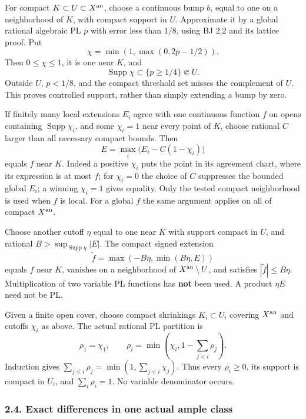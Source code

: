 \documentclass[
  10pt,
]{article}
\begin{document}
For compact \(K\subset U\subset X^{\rm an}\), choose a continuous bump
\(b\), equal to one on a neighborhood of \(K\), with compact support in
\(U\). Approximate it by a global rational algebraic PL \(p\) with error
less than \(1/8\), using BJ 2.2 and its lattice proof. Put
\[\chi=\min(1,\max(0,2p-1/2)). \tag{2.5}\] Then \(0\le\chi\le1\), it is
one near \(K\), and
\[\operatorname{Supp}\chi\subset\{p\ge1/4\}\Subset U.\] Outside \(U\),
\(p<1/8\), and the compact threshold set misses the complement of \(U\).
This proves controlled support, rather than simply extending a bump by
zero.

If finitely many local extensions \(E_i\) agree with one continuous
function \(f\) on opens containing \(\operatorname{Supp}\chi_i\), and
some \(\chi_i=1\) near every point of \(K\), choose rational \(C\)
larger than all necessary compact bounds. Then
\[E=\max_i\bigl(E_i-C(1-\chi_i)\bigr) \tag{2.6}\] equals \(f\) near
\(K\). Indeed a positive \(\chi_i\) puts the point in its agreement
chart, where its expression is at most \(f\); for \(\chi_i=0\) the
choice of \(C\) suppresses the bounded global \(E_i\); a winning
\(\chi_i=1\) gives equality. Only the tested compact neighborhood is
used when \(f\) is local. For a global \(f\) the same argument applies
on all of compact \(X^{\rm an}\).

Choose another cutoff \(\eta\) equal to one near \(K\) with support
compact in \(U\), and rational \(B>\sup_{\operatorname{Supp}\eta}|E|\).
The compact signed extension
\[\widetilde f=\max(-B\eta,\min(B\eta,E)) \tag{2.7}\] equals \(f\) near
\(K\), vanishes on a neighborhood of \(X^{\rm an}\setminus U\), and
satisfies \(|\widetilde f|\le B\eta\). Multiplication of two variable PL
functions has \textbf{not} been used. A product \(\eta E\) need not be
PL.

Given a finite open cover, choose compact shrinkings \(K_i\subset U_i\)
covering \(X^{\rm an}\) and cutoffs \(\chi_i\) as above. The actual
rational PL partition is
\[\rho_1=\chi_1,\qquad \rho_i=\min(\chi_i,1-\sum_{j<i}\rho_j). \tag{2.8}\]
Induction gives \(\sum_{j\le i}\rho_j=\min(1,\sum_{j\le i}\chi_j)\).
Thus every \(\rho_i\ge0\), its support is compact in \(U_i\), and
\(\sum_i\rho_i=1\). No variable denominator occurs.

\subsubsection{2.4. Exact differences in one actual ample
class}\label{exact-differences-in-one-actual-ample-class}
\end{document}
